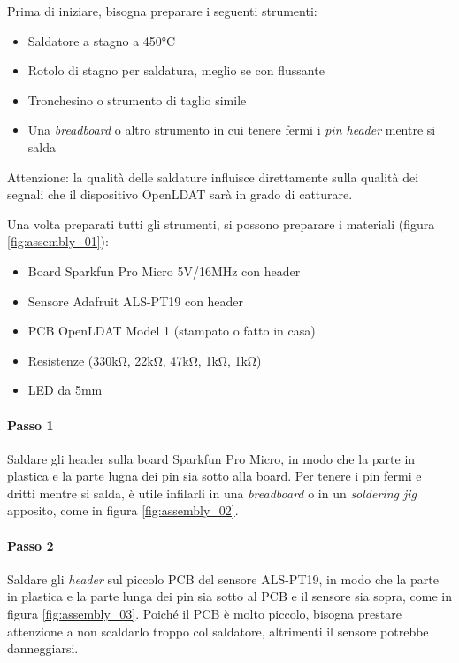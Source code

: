 Prima di iniziare, bisogna preparare i seguenti strumenti:
\begin{itemize}
	\item Saldatore a stagno a 450°C
	\item Rotolo di stagno per saldatura, meglio se con flussante
	\item Tronchesino o strumento di taglio simile
	\item Una \textit{breadboard} o altro strumento in cui tenere fermi i \textit{pin header} mentre si salda
\end{itemize}

Attenzione: la qualità delle saldature influisce direttamente sulla qualità dei segnali che il dispositivo OpenLDAT sarà in grado di catturare.

Una volta preparati tutti gli strumenti, si possono preparare i materiali (figura \ref{fig:assembly_01}):
\begin{itemize}
	\item Board Sparkfun Pro Micro 5V/16MHz con header
	\item Sensore Adafruit ALS-PT19 con header
	\item PCB OpenLDAT Model 1 (stampato o fatto in casa)
	\item Resistenze (330k\si{\ohm}, 22k\si{\ohm}, 47k\si{\ohm}, 1k\si{\ohm}, 1k\si{\ohm})
	\item LED da 5mm
\end{itemize}

\paragraph{Passo 1} Saldare gli header sulla board Sparkfun Pro Micro, in modo che la parte in plastica e la parte lugna dei pin sia sotto alla board. Per tenere i pin fermi e dritti mentre si salda, è utile infilarli in una \textit{breadboard} o in un \textit{soldering jig} apposito, come in figura \ref{fig:assembly_02}.

\paragraph{Passo 2} Saldare gli \textit{header} sul piccolo PCB del sensore ALS-PT19, in modo che la parte in plastica e la parte lunga dei pin sia sotto al PCB e il sensore sia sopra, come in figura \ref{fig:assembly_03}. Poiché il PCB è molto piccolo, bisogna prestare attenzione a non scaldarlo troppo col saldatore, altrimenti il sensore potrebbe danneggiarsi.


